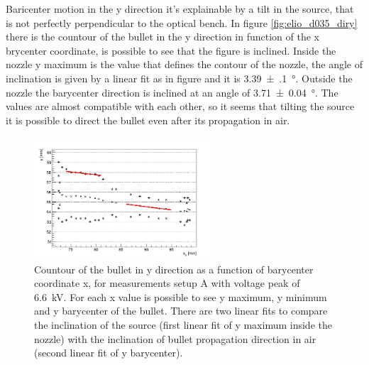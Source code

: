 Baricenter motion in the y direction it's explainable by a tilt in the source, that is not perfectly perpendicular to the optical bench. In figure \ref{fig:elio_d035_diry} there is the countour of the bullet in the y direction in function of the x brycenter coordinate, is possible to see that the figure is inclined. Inside the nozzle y maximum is the value that defines the contour of the nozzle, the angle of inclination is given by a linear fit as in figure and it is \SI{3.39(10)}{\degree}. Outside the nozzle the barycenter direction is inclined at an angle of \SI{3.71(4)}{\degree}. The values are almost compatible with each other, so it seems that tilting the source it is possible to direct the bullet even after its propagation in air.
\begin{figure}
 \centering
 \includegraphics[width=0.6\textwidth]{Images/Shape/elio_d035_incl.png}
 \caption{Countour of the bullet in y direction as a function of barycenter coordinate x, for measurements setup A with voltage peak of \SI{6.6}{\kilo\volt}. For each x value is possible to see y maximum, y minimum and y barycenter of the bullet. There are two linear fits to compare the inclination of the source (first linear fit of y maximum inside the nozzle) with the inclination of bullet propagation direction in air (second linear fit of y barycenter).}
\end{figure}


